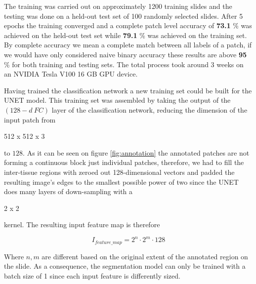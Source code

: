 \documentclass[a4paper,12pt]{article}
\begin{document}
\vspace{4mm}

\par The training was carried out on approximately 1200 training slides and the testing was done on a held-out test set of 100 randomly selected slides. After 5 epochs the training converged and a complete patch level accuracy of \textbf{73.1} \% was achieved on the held-out test set while \textbf{79.1} \% was achieved on the training set. By complete accuracy we mean a complete match between all labels of a patch, if we would have only considered naive binary accuracy these results are above \textbf{95} \% for both training and testing sets. The total process took around 3 weeks on an NVIDIA Tesla V100 16 GB GPU device.

\vspace{4mm}

\par Having trained the classification network a new training set could be built for the UNET model. This training set was assembled by taking the output of the $(128-d \ FC)$ layer of the classification network, reducing the dimension of the input patch from \begin{markdown}
512 x 512 x 3
\end{markdown}
to $128$. As it can be seen on figure \ref{fig:annotation} the annotated patches are not forming a continuous block just individual patches, therefore, we had to fill the inter-tissue regions with zeroed out 128-dimensional vectors and padded the resulting image's edges to the smallest possible power of two since the UNET does many layers of down-sampling with a \begin{markdown}
2 x 2
\end{markdown}
kernel. The resulting input feature map is therefore 

\begin{equation*}
    I_{feature\_map} = 2^{n} \cdot 2^{m} \cdot 128
\end{equation*}

\par Where $n, m$ are different based on the original extent of the annotated region on the slide. As a consequence, the segmentation model can only be trained with a batch size of 1 since each input feature is differently sized. 

\vspace{4mm}
\end{document}
